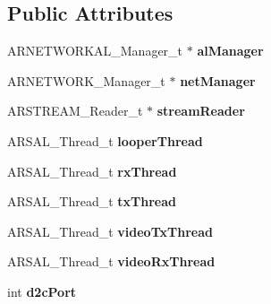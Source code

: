 \subsection*{Public Attributes}
\begin{DoxyCompactItemize}
\item 
\hypertarget{structBD__MANAGER__t_a72f94bb1cd0f3fc17091f33ef86b9854}{}A\+R\+N\+E\+T\+W\+O\+R\+K\+A\+L\+\_\+\+Manager\+\_\+t $\ast$ {\bfseries al\+Manager}\label{structBD__MANAGER__t_a72f94bb1cd0f3fc17091f33ef86b9854}

\item 
\hypertarget{structBD__MANAGER__t_aa206d61e05f8bbd07c8f2fb95fb2c9de}{}A\+R\+N\+E\+T\+W\+O\+R\+K\+\_\+\+Manager\+\_\+t $\ast$ {\bfseries net\+Manager}\label{structBD__MANAGER__t_aa206d61e05f8bbd07c8f2fb95fb2c9de}

\item 
\hypertarget{structBD__MANAGER__t_aa4299944778f151a55ee726fe1ac1c5b}{}A\+R\+S\+T\+R\+E\+A\+M\+\_\+\+Reader\+\_\+t $\ast$ {\bfseries stream\+Reader}\label{structBD__MANAGER__t_aa4299944778f151a55ee726fe1ac1c5b}

\item 
\hypertarget{structBD__MANAGER__t_a09aba83d294e3ca0263e8de3946c76e0}{}A\+R\+S\+A\+L\+\_\+\+Thread\+\_\+t {\bfseries looper\+Thread}\label{structBD__MANAGER__t_a09aba83d294e3ca0263e8de3946c76e0}

\item 
\hypertarget{structBD__MANAGER__t_aa4735b3bb6c989bfcd6cb51e90789b44}{}A\+R\+S\+A\+L\+\_\+\+Thread\+\_\+t {\bfseries rx\+Thread}\label{structBD__MANAGER__t_aa4735b3bb6c989bfcd6cb51e90789b44}

\item 
\hypertarget{structBD__MANAGER__t_a5ab27da27e34c5e76dbbc033fe99d080}{}A\+R\+S\+A\+L\+\_\+\+Thread\+\_\+t {\bfseries tx\+Thread}\label{structBD__MANAGER__t_a5ab27da27e34c5e76dbbc033fe99d080}

\item 
\hypertarget{structBD__MANAGER__t_a14246d06a707dcb4bcf0dc2f541ee09c}{}A\+R\+S\+A\+L\+\_\+\+Thread\+\_\+t {\bfseries video\+Tx\+Thread}\label{structBD__MANAGER__t_a14246d06a707dcb4bcf0dc2f541ee09c}

\item 
\hypertarget{structBD__MANAGER__t_a7b58d261b275c75e79b7345476983e1c}{}A\+R\+S\+A\+L\+\_\+\+Thread\+\_\+t {\bfseries video\+Rx\+Thread}\label{structBD__MANAGER__t_a7b58d261b275c75e79b7345476983e1c}

\item 
\hypertarget{structBD__MANAGER__t_a9bcabdb60dcfffe872d576b2257583fe}{}int {\bfseries d2c\+Port}\label{structBD__MANAGER__t_a9bcabdb60dcfffe872d576b2257583fe}


\end{DoxyCompactItemize}
